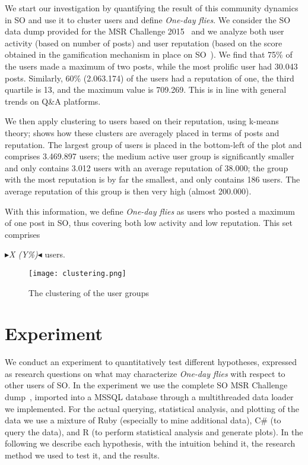 \documentclass[conference]{IEEEtran}
\newcommand{\nb}[3]{
  \fcolorbox{black}{#2}{\bfseries\sffamily\scriptsize#1}
    {\sf\small$\blacktriangleright$\textit{#3}$\blacktriangleleft$}
}
\newcommand\AB[1]{\nb{alberto}{cyan}{#1}}
\newcommand\odf{\emph{One-day flies}\xspace}
\begin{document}
We start our investigation by quantifying the result of this community dynamics
in SO and use it to cluster users and define \odf. We consider the SO data dump
provided for the MSR Challenge 2015~\cite{MSRChallenge2015} and we analyze both
user activity (based on number of posts) and user reputation (based on the
score obtained in the gamification mechanism in place on
SO~\cite{anderson2013steering}).  We find that 75\% of the users made a maximum
of two posts, while the most prolific user had 30.043 posts. Similarly, 60\%
(2.063.174) of the users had a reputation of one, the third quartile is 13, and
the maximum value is 709.269.  This is in line with general trends on Q\&A
platforms.

We then apply clustering to users based on their reputation, using k-means
theory;  shows how these clusters are averagely placed
in terms of posts and reputation. The largest group of users is placed in the
bottom-left of the plot and comprises 3.469.897 users; the
medium active user group is significantly smaller and only contains 3.012 users
with an average reputation of 38.000;  the group with the most reputation is by
far the smallest, and only contains 186 users. The average reputation of this
group is then very high (almost 200.000).

With this information, we define \odf as users who posted a maximum of one post
in SO, thus covering both low activity and low reputation. This set comprises
\AB{X (Y\%)} users. 

\begin{figure}[h]
 \texttt{[image: clustering.png]}
 \caption{The clustering of the user groups}
 \label{kmeans_clustering}
\end{figure}


\section{Experiment}

We conduct an experiment to quantitatively test different hypotheses, expressed
as research questions on what may characterize \odf with respect to other users
of SO. In the experiment we use the complete SO MSR Challenge
dump~\cite{MSRChallenge2015}, imported into a MSSQL database through a
multithreaded data loader we implemented.  For the actual querying, statistical
analysis, and plotting of the data we use a mixture of Ruby (especially to mine
additional data), C\# (to query the data), and R (to perform statistical
analysis and generate plots).  In the following we describe each hypothesis,
with the intuition behind it, the research method we used to test it, and the
results.
\end{document}
